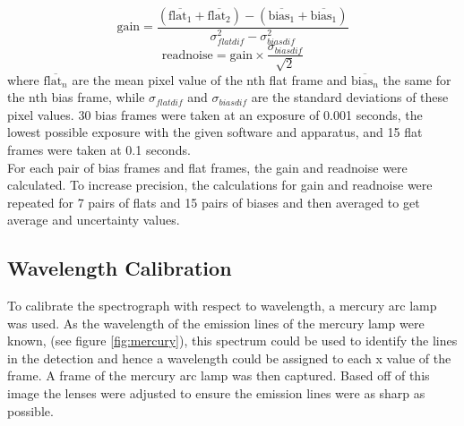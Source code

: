 \documentclass[a4paper,12pt,twocolumn]{article}
\begin{document}
			\begin{equation}
				\text{gain} = \frac{(\overline{\text{flat}_1} + \overline{\text{flat}_2}) - (\overline{\text{bias}_1} + \overline{\text{bias}_1})}{\sigma_{flatdif}^2 - \sigma_{biasdif}^2}
				\label{eq:gain}
			\end{equation}
			\begin{equation}
				\text{readnoise} = \text{gain} \times \frac{\sigma_{biasdif}}{\sqrt{2}}
				\label{eq:readnoise}
			\end{equation} where $\overline{\text{flat}_n}$ are the mean pixel value of the nth flat frame and $\overline{\text{bias}_n}$ the same for the nth bias frame, while $\sigma_{flatdif}$ and $\sigma_{biasdif}$ are the standard deviations of these pixel values. 30 bias frames were taken at an exposure of 0.001 seconds, the lowest possible exposure with the given software and apparatus, and 15 flat frames were taken at 	0.1 seconds.\\
			
			For each pair of bias frames and flat frames, the gain and readnoise were calculated. To increase precision, the calculations for gain and readnoise were repeated for 7 pairs of flats and 15 pairs of biases and then averaged to get average and uncertainty values.
		
		\subsection{Wavelength Calibration}
			To calibrate the spectrograph with respect to wavelength, a mercury arc lamp was used. As the wavelength of the emission lines of the mercury lamp were known, (see figure \ref{fig:mercury}), this spectrum could be used to identify the lines in the detection and hence a wavelength could be assigned to each x value of the frame. A frame of the mercury arc lamp was then captured. Based off of this image the lenses were adjusted to ensure the emission lines were as sharp as possible.\\
			
\end{document}
